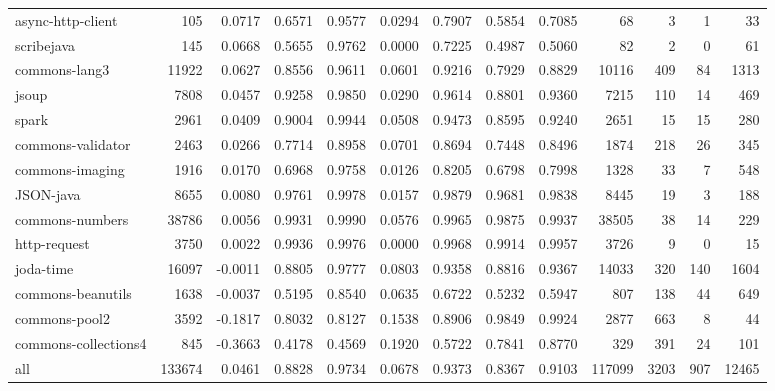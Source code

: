 \begin{table*}
\begin{tabular}{lrrrrrrrrrrrr}
      async-http-client &     105 &      0.0717 &  0.6571 &     0.9577 &     0.0294 &  0.7907 &     0.5854 &   0.7085 &      68 &     3 &    1 &     33 \\
             scribejava &     145 &      0.0668 &  0.5655 &     0.9762 &     0.0000 &  0.7225 &     0.4987 &   0.5060 &      82 &     2 &    0 &     61 \\
          commons-lang3 &   11922 &      0.0627 &  0.8556 &     0.9611 &     0.0601 &  0.9216 &     0.7929 &   0.8829 &   10116 &   409 &   84 &   1313 \\
                  jsoup &    7808 &      0.0457 &  0.9258 &     0.9850 &     0.0290 &  0.9614 &     0.8801 &   0.9360 &    7215 &   110 &   14 &    469 \\
                  spark &    2961 &      0.0409 &  0.9004 &     0.9944 &     0.0508 &  0.9473 &     0.8595 &   0.9240 &    2651 &    15 &   15 &    280 \\
      commons-validator &    2463 &      0.0266 &  0.7714 &     0.8958 &     0.0701 &  0.8694 &     0.7448 &   0.8496 &    1874 &   218 &   26 &    345 \\
        commons-imaging &    1916 &      0.0170 &  0.6968 &     0.9758 &     0.0126 &  0.8205 &     0.6798 &   0.7998 &    1328 &    33 &    7 &    548 \\
              JSON-java &    8655 &      0.0080 &  0.9761 &     0.9978 &     0.0157 &  0.9879 &     0.9681 &   0.9838 &    8445 &    19 &    3 &    188 \\
        commons-numbers &   38786 &      0.0056 &  0.9931 &     0.9990 &     0.0576 &  0.9965 &     0.9875 &   0.9937 &   38505 &    38 &   14 &    229 \\
           http-request &    3750 &      0.0022 &  0.9936 &     0.9976 &     0.0000 &  0.9968 &     0.9914 &   0.9957 &    3726 &     9 &    0 &     15 \\
              joda-time &   16097 &     -0.0011 &  0.8805 &     0.9777 &     0.0803 &  0.9358 &     0.8816 &   0.9367 &   14033 &   320 &  140 &   1604 \\
      commons-beanutils &    1638 &     -0.0037 &  0.5195 &     0.8540 &     0.0635 &  0.6722 &     0.5232 &   0.5947 &     807 &   138 &   44 &    649 \\
          commons-pool2 &    3592 &     -0.1817 &  0.8032 &     0.8127 &     0.1538 &  0.8906 &     0.9849 &   0.9924 &    2877 &   663 &    8 &     44 \\
   commons-collections4 &     845 &     -0.3663 &  0.4178 &     0.4569 &     0.1920 &  0.5722 &     0.7841 &   0.8770 &     329 &   391 &   24 &    101 \\
                    all &  133674 &      0.0461 &  0.8828 &     0.9734 &     0.0678 &  0.9373 &     0.8367 &   0.9103 &  117099 &  3203 &  907 &  12465 \\
\bottomrule
\end{tabular}
\end{table*}
